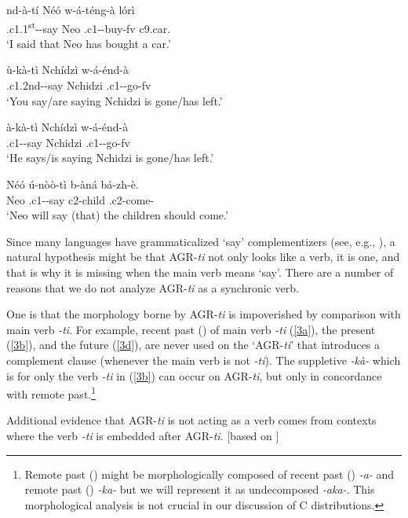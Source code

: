 \documentclass[output=paper,
modfonts
]{langscibook}
\begin{document}
\ea \label{3}
\ea\label{3a} \gll nd-à-tí Néó w-á-téng-à	lórì \\
	.c1.1\textsuperscript{st}--say	Neo	.c1--buy-fv		c9.car.\\ 
	\glt `I said that Neo has bought a car.'

\ex\label{3b}  \gll	ù-kà-tì			Nchídzì	w-á-énd-à \\
     	.c1.2nd--say	Nchidzi	.c1--go-fv \\
	\glt `You say/are saying  Nchidzi is gone\slash has left.'

\ex\label{3c}    \gll à-kà-tì			Nchídzì	w-á-énd-à \\
      	.c1--say	Nchidzi	.c1--go-fv \\
     	\glt `He says/is saying Nchidzi is gone\slash has left.' 

\ex\label{3d}  \gll Néó	ú-nòò-tì		b-àná		bá-zh-è.\\
	Neo	.c1--say	c2-child	.c2-come-\\
	\glt `Neo will say (that) the children should come.'

\z
\z 

Since many languages have grammaticalized `say' complementizers (see, e.g., \citealt{Heine2002}), a natural hypothesis might be that AGR-\textit{ti} not only looks like a verb, it is one, and that is why it is missing when the main verb means `say'. There are a number of reasons that we do not analyze AGR-\textit{ti} as a synchronic verb. 

One is that the morphology borne by AGR-\textit{ti} is impoverished by comparison with main verb \textit{-ti}. For example,  recent past () of main verb \textit{-ti} (\ref{3a}), the present (\ref{3b}), and the future (\ref{3d}),  are never used on the ‘AGR-\textit{ti}’ that introduces a complement clause (whenever the main verb is not \textit{-ti}). The suppletive \textit{-kà-} which is  for only the verb \textit{-ti} in (\ref{3b})   can occur on AGR-\textit{ti}, but only in concordance with remote past.\footnote{Remote past () might be morphologically composed of recent past () \textit{-a-} and remote past () \textit{-ka-} but we will represent it as undecomposed \textit{-aka-}. This morphological analysis is not crucial in our discussion of C distributions.}  

Additional evidence that AGR-\textit{ti} is not acting as a verb comes from contexts where the verb \textit{-ti} is embedded after AGR-\textit{ti}. [based on \citealt[ID559]{AfranaphDatabaseOngoing}]
\end{document}
